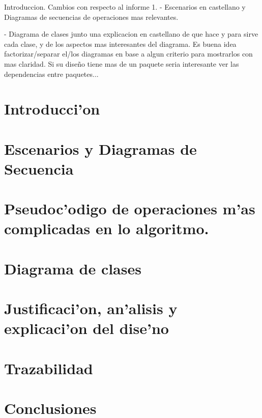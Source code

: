 \documentclass[spanish, a4paper, 10pt, titlepage]{article}
\author{Echevarr'ia - Farjat - Freijo - Giusto}
\begin{document}

\tableofcontents
\clearpage


Introduccion. Cambios con respecto al informe 1.
- Escenarios en castellano y Diagramas de secuencias de operaciones mas relevantes.

- Diagrama de clases junto una explicacion en castellano de que hace y para sirve cada clase, y de los aspectos mas interesantes del diagrama. Es buena idea factorizar/separar el/los diagramas en base a algun criterio para mostrarlos con mas claridad. Si su diseño tiene mas de un paquete seria interesante ver las dependencias entre paquetes...


\section{Introducci'on}

\clearpage
 
\section{Escenarios y Diagramas de Secuencia}

\clearpage

\section{Pseudoc'odigo de operaciones m'as complicadas en lo algoritmo.}



\section{Diagrama de clases}

\clearpage

\section{Justificaci'on, an'alisis y explicaci'on del dise'no}

\clearpage

\section{Trazabilidad}

\clearpage

\section{Conclusiones}

\clearpage
\end{document}
